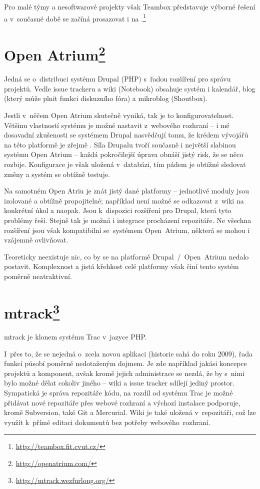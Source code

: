 \documentclass[thesis=B,czech]{FITthesis}[2012/05/02]
\begin{document}
Pro malé týmy a nesoftwarové projekty však Teambox představuje výborné řešení a
v~současné době se začíná prosazovat i na .\footnote{\url{http://teambox.fit.cvut.cz/}}

\section[Open Atrium]{Open Atrium\footnote{\url{http://openatrium.com/}}}

Jedná se o~distribuci systému Drupal (PHP) s~řadou rozšíření pro správu
projektů. Vedle issue trackeru a wiki (Notebook) obsahuje systém i
kalendář, blog (který může plnit funkci diskuzního fóra) a
\gls{mikroblog} (Shoutbox).

Jestli v~něčem Open Atrium skutečně vyniká, tak je to
konfigurovatelnost. Většinu vlastností systému je možné nastavit
z~webového rozhraní -- i mé dosavadní zkušenosti se systémem Drupal
nasvědčují tomu, že krédem vývojářů na této platformě je zřejmě
. Síla Drupalu tvoří současně i největší
slabinou systému Open Atrium -- každá pokročilejší úprava obnáší jistý
risk, že se něco rozbije. Konfigurace je však uložená v~databázi, tím
pádem je obtížné sledovat změny a systém se obtížně testuje.

Na samotném Open Atriu je znát jistý  dané platformy --
jednotlivé moduly jsou izolované a obtížně propojitelné; například není
možné se odkazovat z~wiki na konkrétní úkol a naopak. Jsou k~dispozici
rozšíření pro Drupal, která tyto problémy řeší. Stejně tak je možná i
integrace procházení repozitáře. Ne všechna rozšíření jsou však
kompatibilní se~systémem Open~Atrium, některá se mohou i vzájemně
ovlivňovat.

Teoreticky neexistuje nic, co by se na platformě Drupal~/~Open~Atrium nedalo
postavit. Komplexnost a jistá křehkost celé platformy však činí tento
systém poměrně neatraktivní.

\newpage

\section[mtrack]{mtrack\footnote{\url{http://mtrack.wezfurlong.org/}}}

mtrack je klonem systému Trac v~jazyce PHP.

I~přes to, že se nejedná o~zcela novou aplikaci (historie sahá do roku
2009), řada funkcí působí poměrně nedotaženým dojmem. Je zde například
jakási koncepce projektů a komponent, avšak kromě jejich administrace se
nezdá, že by s~nimi bylo možné dělat cokoliv jiného -- wiki a issue
tracker sdílejí jediný prostor. Sympatická je správa repozitáře kódu,
na rozdíl od systému Trac je možné přidávat nové repozitáře přes webové
rozhraní a výchozí instalace podporuje, kromě Subversion, také Git a
Mercurial. Wiki je také uložená v~repozitáři, což lze využít k~přímé
editaci dokumentů bez potřeby webového~rozhraní.
\end{document}
